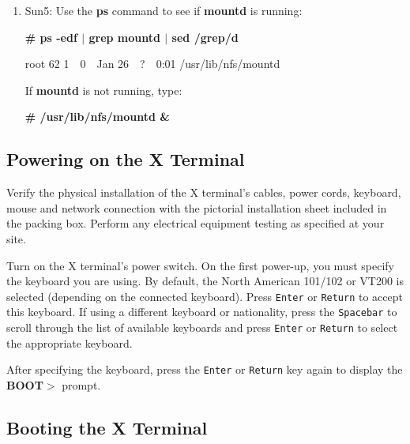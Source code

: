 \begin {enumerate}
{\bf \# ps} {\tt -options} {\bf $|$ grep nfsd $|$ sed /grep/d}

root 62 1\ \ 0\ \ Jan 26\ \ ?\ \ 0:01 nfsd

If {\bf nfsd} is not running, type:

{\bf \# /usr/etc/nfsd 8 \&}

or for Sun5: {\bf \# /usr/lib/nfs/nfsd 8 \&}

If {\bf nfsd} is running, use the {\bf kill} command with the PID to restart
the daemon (the PID is 62 in the preceding {\bf ps} example):

{\bf \# kill -1} {\tt PID}

\item Sun5: Use the {\bf ps} command to see if {\bf mountd} is running:

{\bf \# ps -edf $|$ grep mountd $|$ sed /grep/d}

root 62 1\ \ 0\ \ Jan 26\ \ ?\ \ 0:01 /usr/lib/nfs/mountd

If {\bf mountd} is not running, type:

{\bf \# /usr/lib/nfs/mountd \&}

\end {enumerate}


\subsection {Powering on the X Terminal}

Verify the physical installation of the X terminal's cables, power cords,
keyboard, mouse and network connection with the pictorial installation sheet
included in the packing box. Perform any electrical equipment testing as
specified at your site.

Turn on the X terminal's power switch. On the first power-up, you must specify
the keyboard you are using. By default, the North American 101/102 or VT200 is
selected (depending on the connected keyboard). Press {\tt Enter} or
{\tt Return} to accept this keyboard. If using a different keyboard or
nationality, press the {\tt Spacebar} to scroll through the list of available
keyboards and press {\tt Enter} or {\tt Return} to select the appropriate
keyboard.

After specifying the keyboard, press the {\tt Enter} or {\tt Return} key again
to display the {\bf BOOT$>$} prompt.

\subsection {Booting the X Terminal}

